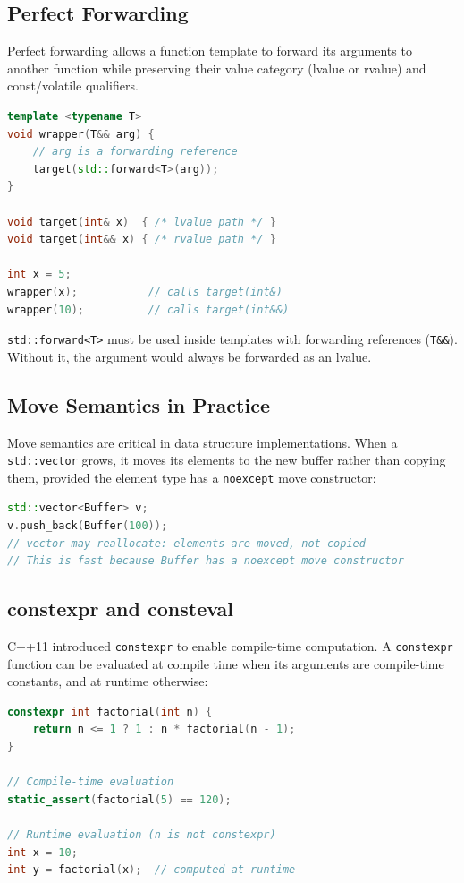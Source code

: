 \subsection{Perfect Forwarding}

Perfect forwarding allows a function template to forward its arguments to another function while preserving their value category (lvalue or rvalue) and const/volatile qualifiers.

\begin{lstlisting}[language=C++]
template <typename T>
void wrapper(T&& arg) {
    // arg is a forwarding reference
    target(std::forward<T>(arg));
}

void target(int& x)  { /* lvalue path */ }
void target(int&& x) { /* rvalue path */ }

int x = 5;
wrapper(x);           // calls target(int&)
wrapper(10);          // calls target(int&&)
\end{lstlisting}

\texttt{std::forward<T>} must be used inside templates with forwarding references (\texttt{T\&\&}). Without it, the argument would always be forwarded as an lvalue.

\subsection{Move Semantics in Practice}

Move semantics are critical in data structure implementations. When a \texttt{std::vector} grows, it moves its elements to the new buffer rather than copying them, provided the element type has a \texttt{noexcept} move constructor:

\begin{lstlisting}[language=C++]
std::vector<Buffer> v;
v.push_back(Buffer(100));
// vector may reallocate: elements are moved, not copied
// This is fast because Buffer has a noexcept move constructor
\end{lstlisting}

\subsection{constexpr and consteval}

C++11 introduced \texttt{constexpr} to enable compile-time computation. A \texttt{constexpr} function can be evaluated at compile time when its arguments are compile-time constants, and at runtime otherwise:

\begin{lstlisting}[language=C++]
constexpr int factorial(int n) {
    return n <= 1 ? 1 : n * factorial(n - 1);
}

// Compile-time evaluation
static_assert(factorial(5) == 120);

// Runtime evaluation (n is not constexpr)
int x = 10;
int y = factorial(x);  // computed at runtime
\end{lstlisting}

